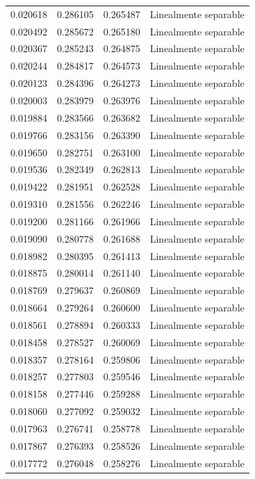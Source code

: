 \begin{tabular}{llll}
0.020618 & 0.286105 & 0.265487 & Linealmente separable \\
0.020492 & 0.285672 & 0.265180 & Linealmente separable \\
0.020367 & 0.285243 & 0.264875 & Linealmente separable \\
0.020244 & 0.284817 & 0.264573 & Linealmente separable \\
0.020123 & 0.284396 & 0.264273 & Linealmente separable \\
0.020003 & 0.283979 & 0.263976 & Linealmente separable \\
0.019884 & 0.283566 & 0.263682 & Linealmente separable \\
0.019766 & 0.283156 & 0.263390 & Linealmente separable \\
0.019650 & 0.282751 & 0.263100 & Linealmente separable \\
0.019536 & 0.282349 & 0.262813 & Linealmente separable \\
0.019422 & 0.281951 & 0.262528 & Linealmente separable \\
0.019310 & 0.281556 & 0.262246 & Linealmente separable \\
0.019200 & 0.281166 & 0.261966 & Linealmente separable \\
0.019090 & 0.280778 & 0.261688 & Linealmente separable \\
0.018982 & 0.280395 & 0.261413 & Linealmente separable \\
0.018875 & 0.280014 & 0.261140 & Linealmente separable \\
0.018769 & 0.279637 & 0.260869 & Linealmente separable \\
0.018664 & 0.279264 & 0.260600 & Linealmente separable \\
0.018561 & 0.278894 & 0.260333 & Linealmente separable \\
0.018458 & 0.278527 & 0.260069 & Linealmente separable \\
0.018357 & 0.278164 & 0.259806 & Linealmente separable \\
0.018257 & 0.277803 & 0.259546 & Linealmente separable \\
0.018158 & 0.277446 & 0.259288 & Linealmente separable \\
0.018060 & 0.277092 & 0.259032 & Linealmente separable \\
0.017963 & 0.276741 & 0.258778 & Linealmente separable \\
0.017867 & 0.276393 & 0.258526 & Linealmente separable \\
0.017772 & 0.276048 & 0.258276 & Linealmente separable \\

\end{tabular}
